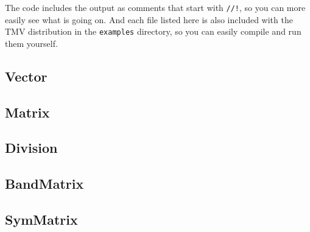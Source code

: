 \documentclass[twoside,letterpaper,11pt]{article}
\newcommand{\inputcode}[1]{}
\begin{document}
The code includes the output as comments that start with \lstinline{//!}, so you can more easily see what is going on.
And each file listed here is also included with the TMV distribution in the \texttt{examples}
directory, so you can easily compile and run them yourself.

\newpage
\subsection{Vector}

\inputcode{../examples/Vector.cpp}
%
%
\vspace{12pt}

\newpage
\subsection{Matrix}

\inputcode{../examples/Matrix.cpp}
%
%
\vspace{12pt}

\newpage
\subsection{Division}

\inputcode{../examples/Division.cpp}
%
%
\vspace{12pt}

\newpage
\subsection{BandMatrix}

\inputcode{../examples/BandMatrix.cpp}
%
%
\vspace{12pt}

\newpage
\subsection{SymMatrix}

\inputcode{../examples/SymMatrix.cpp}
%
%
\end{document}
